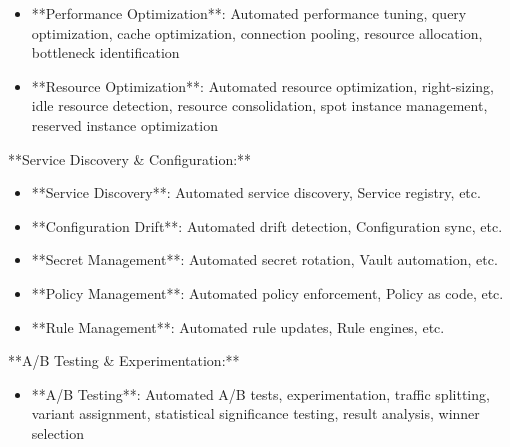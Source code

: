 \documentclass[11pt,a4paper]{article}
\begin{document}
\begin{itemize}
\item **Performance Optimization**: Automated performance tuning, query optimization, cache optimization, connection pooling, resource allocation, bottleneck identification
\end{itemize}

\begin{itemize}
\item **Resource Optimization**: Automated resource optimization, right-sizing, idle resource detection, resource consolidation, spot instance management, reserved instance optimization
\end{itemize}

**Service Discovery \& Configuration:**

\begin{itemize}
\item **Service Discovery**: Automated service discovery, Service registry, etc.
\end{itemize}

\begin{itemize}
\item **Configuration Drift**: Automated drift detection, Configuration sync, etc.
\end{itemize}

\begin{itemize}
\item **Secret Management**: Automated secret rotation, Vault automation, etc.
\end{itemize}

\begin{itemize}
\item **Policy Management**: Automated policy enforcement, Policy as code, etc.
\end{itemize}

\begin{itemize}
\item **Rule Management**: Automated rule updates, Rule engines, etc.
\end{itemize}

**A/B Testing \& Experimentation:**

\begin{itemize}
\item **A/B Testing**: Automated A/B tests, experimentation, traffic splitting, variant assignment, statistical significance testing, result analysis, winner selection
\end{itemize}
\end{document}
